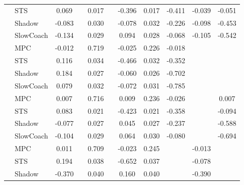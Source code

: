 \begin{tabular}{|l|l|*{9}{c|}}
                                                           & STS &    0.069 &        &     0.017 &     & -0.396 &  0.017 &  -0.411 &  -0.039 &   -0.051 \\
                                                           & Shadow &   -0.083 &        &     0.030 &     & -0.078 &  0.032 &  -0.226 &  -0.098 &   -0.453 \\
                                                           & SlowCoach &   -0.134 &        &     0.029 &     &  0.094 &  0.028 &  -0.068 &  -0.105 &   -0.542 \\
\midrule
[True, False, True, False, True, True, True, False, False] & MPC &   -0.012 &        &     0.719 &     & -0.025 &  0.226 &  -0.018 &      &       \\
                                                           & STS &    0.116 &        &     0.034 &     & -0.466 &  0.032 &  -0.352 &      &       \\
                                                           & Shadow &    0.184 &        &     0.027 &     & -0.060 &  0.026 &  -0.702 &      &       \\
                                                           & SlowCoach &    0.079 &        &     0.032 &     & -0.072 &  0.031 &  -0.785 &      &       \\
\midrule
[True, False, True, False, True, True, True, False, True] & MPC &    0.007 &        &     0.716 &     &  0.009 &  0.236 &  -0.026 &      &    0.007 \\
                                                           & STS &    0.083 &        &     0.021 &     & -0.423 &  0.021 &  -0.358 &      &   -0.094 \\
                                                           & Shadow &   -0.077 &        &     0.027 &     &  0.045 &  0.027 &  -0.237 &      &   -0.588 \\
                                                           & SlowCoach &   -0.104 &        &     0.029 &     &  0.064 &  0.030 &  -0.080 &      &   -0.694 \\
\midrule
[True, False, True, False, True, True, False, True, False] & MPC &    0.011 &        &     0.709 &     & -0.023 &  0.245 &      &  -0.013 &       \\
                                                           & STS &    0.194 &        &     0.038 &     & -0.652 &  0.037 &      &  -0.078 &       \\
                                                           & Shadow &   -0.370 &        &     0.040 &     &  0.160 &  0.040 &      &  -0.390 &       \\

\end{tabular}
